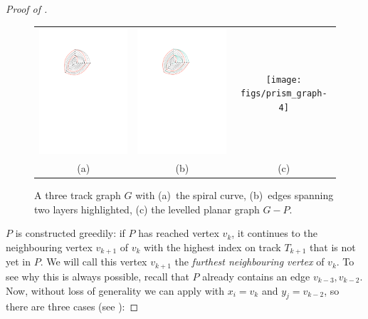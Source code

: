 \documentclass{patmorin}
\begin{document}
\begin{proof}[Proof of ]

  \begin{figure}
  \begin{center}
  \begin{tabular}{ccc}
  \includegraphics[width=.31\textwidth]{figs/prism_graph-2} &
  \includegraphics[width=.31\textwidth]{figs/prism_graph-3} &
  \texttt{[image: figs/prism\_graph-4]} \\
  (a) & (b) & (c)
  \end{tabular}
  \end{center}
  \caption{A three track graph $G$ with (a)~the spiral curve, (b)~edges spanning two layers highlighted, (c) the levelled planar graph $G-P$.}
  \end{figure}

  $P$ is constructed greedily: if $P$ has reached vertex $v_k$, it continues to the neighbouring vertex
  $v_{k+1}$ of $v_{k}$ with the highest index on track $T_{k+1}$ that is not yet in $P$.
  We will call this vertex $v_{k+1}$ the \emph{furthest neighbouring vertex} of $v_k$.  To see why this is always possible,
  recall that $P$ already contains an edge $v_{k-3},v_{k-2}$. Now, without loss of generality we can
  apply  with $x_i=v_k$ and $y_j=v_{k-2}$, so there
  are three cases (see ):


\end{proof}
\end{document}
